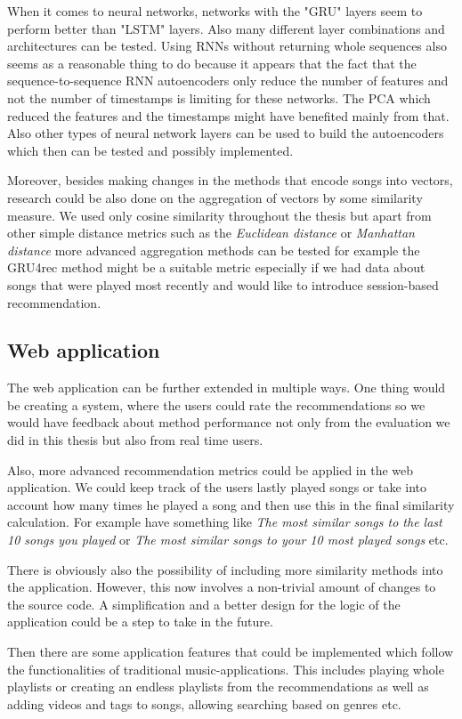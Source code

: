 When it comes to neural networks, networks with the "GRU" layers seem to perform better than "LSTM" layers. Also many different layer combinations and architectures can be tested. Using RNNs without returning whole sequences also seems as a reasonable thing to do because it appears that the fact that the sequence-to-sequence RNN autoencoders only reduce the number of features and not the number of timestamps is limiting for these networks. The PCA which reduced the features and the timestamps might have benefited mainly from that. Also other types of neural network layers can be used to build the autoencoders which then can be tested and possibly implemented.

Moreover, besides making changes in the methods that encode songs into vectors, research could be also done on the aggregation of vectors by some similarity measure. We used only cosine similarity throughout the thesis but apart from other simple distance metrics such as the \textit{Euclidean distance} or \textit{Manhattan distance} more advanced aggregation methods can be tested for example the GRU4rec \cite{gru4rec_article} method might be a suitable metric especially if we had data about songs that were played most recently and would like to introduce session-based recommendation.

\subsection*{Web application}
The web application can be further extended in multiple ways. One thing would be creating a system, where the users could rate the recommendations so we would have feedback about method performance not only from the evaluation we did in this thesis but also from real time users. 

Also, more advanced recommendation metrics could be applied in the web application. We could keep track of the users lastly played songs or take into account how many times he played a song and then use this in the final similarity calculation. For example have something like \textit{The most similar songs to the last 10 songs you played} or \textit{The most similar songs to your 10 most played songs} etc. 

There is obviously also the possibility of including more similarity methods into the application. However, this now involves a non-trivial amount of changes to the source code. A simplification and a better design for the logic of the application could be a step to take in the future. 

Then there are some application features that could be implemented which follow the functionalities of traditional music-applications. This includes playing whole playlists or creating an endless playlists from the recommendations as well as adding videos and tags to songs, allowing searching based on genres etc. 


